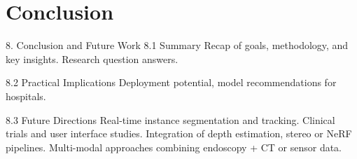 \section{Conclusion}
\label{sec:conclusion}

8. Conclusion and Future Work
    8.1 Summary
        Recap of goals, methodology, and key insights.
        Research question answers.

    8.2 Practical Implications
        Deployment potential, model recommendations for hospitals.

    8.3 Future Directions
        Real-time instance segmentation and tracking.
        Clinical trials and user interface studies.
        Integration of depth estimation, stereo or NeRF pipelines.
        Multi-modal approaches combining endoscopy + CT or sensor data.